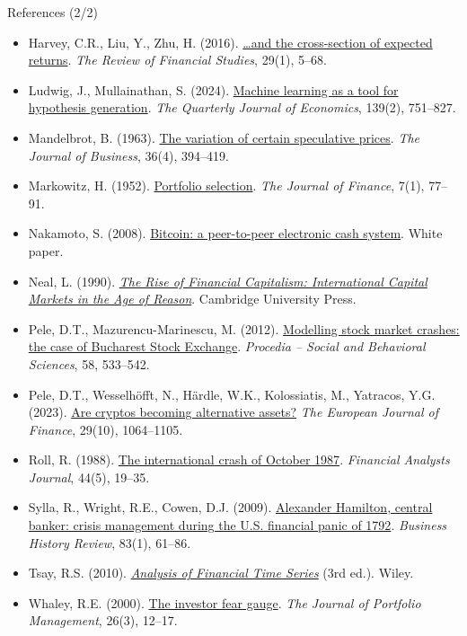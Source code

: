 \begin{frame}{References (2/2)}
\itemsize{\tiny}
\begin{itemize}
    \item Harvey, C.R., Liu, Y., Zhu, H. (2016). \href{https://doi.org/10.1093/rfs/hhv059}{\ldots and the cross-section of expected returns}. \emph{The Review of Financial Studies}, 29(1), 5--68.
    \item Ludwig, J., Mullainathan, S. (2024). \href{https://doi.org/10.1093/qje/qjad055}{Machine learning as a tool for hypothesis generation}. \emph{The Quarterly Journal of Economics}, 139(2), 751--827.
    \item Mandelbrot, B. (1963). \href{https://doi.org/10.1086/294632}{The variation of certain speculative prices}. \emph{The Journal of Business}, 36(4), 394--419.
    \item Markowitz, H. (1952). \href{https://doi.org/10.1111/j.1540-6261.1952.tb01525.x}{Portfolio selection}. \emph{The Journal of Finance}, 7(1), 77--91.
    \item Nakamoto, S. (2008). \href{https://bitcoin.org/bitcoin.pdf}{Bitcoin: a peer-to-peer electronic cash system}. White paper.
    \item Neal, L. (1990). \href{https://doi.org/10.1017/CBO9780511665127}{\emph{The Rise of Financial Capitalism: International Capital Markets in the Age of Reason}}. Cambridge University Press.
    \item Pele, D.T., Mazurencu-Marinescu, M. (2012). \href{https://doi.org/10.1016/j.sbspro.2012.09.1030}{Modelling stock market crashes: the case of Bucharest Stock Exchange}. \emph{Procedia -- Social and Behavioral Sciences}, 58, 533--542.
    \item Pele, D.T., Wesselhöfft, N., Härdle, W.K., Kolossiatis, M., Yatracos, Y.G. (2023). \href{https://doi.org/10.1080/1351847X.2021.1960403}{Are cryptos becoming alternative assets?} \emph{The European Journal of Finance}, 29(10), 1064--1105.
    \item Roll, R. (1988). \href{https://doi.org/10.2469/faj.v44.n5.19}{The international crash of October 1987}. \emph{Financial Analysts Journal}, 44(5), 19--35.
    \item Sylla, R., Wright, R.E., Cowen, D.J. (2009). \href{https://doi.org/10.1017/S0007680500000209}{Alexander Hamilton, central banker: crisis management during the U.S. financial panic of 1792}. \emph{Business History Review}, 83(1), 61--86.
    \item Tsay, R.S. (2010). \href{https://doi.org/10.1002/9780470644560}{\emph{Analysis of Financial Time Series}} (3rd ed.). Wiley.
    \item Whaley, R.E. (2000). \href{https://doi.org/10.3905/jpm.2000.319728}{The investor fear gauge}. \emph{The Journal of Portfolio Management}, 26(3), 12--17.
\end{itemize}
\end{frame}


